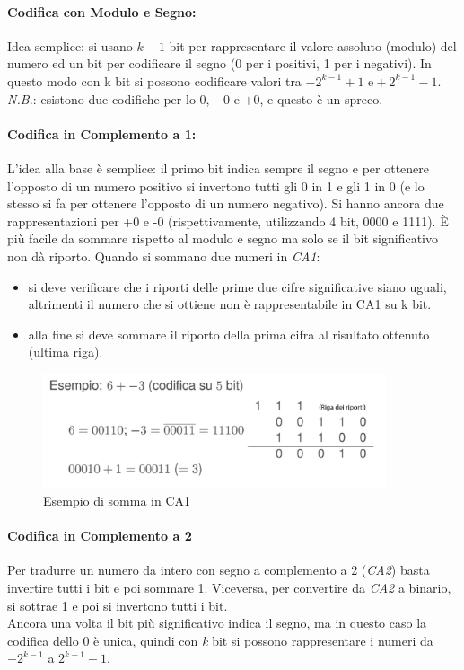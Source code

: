 \documentclass[class=book, crop=false, oneside]{standalone}
\begin{document}
\paragraph*{Codifica con Modulo e Segno:} Idea semplice: si usano $k-1$ bit per rappresentare il valore assoluto (modulo) del numero  ed un bit per codificare il segno (0 per i positivi, 1 per i negativi). In questo modo con k bit si possono codificare valori tra $-2^{k-1}+1 \text{ e} +2^{k-1}-1$.\\
\emph{N.B.}: esistono due codifiche per lo $0$, $-0$  e $+0$, e questo è un spreco.

\paragraph*{Codifica in Complemento a 1:} L’idea alla base è semplice: il primo bit indica sempre il segno e per ottenere l’opposto di un numero positivo si invertono tutti gli 0 in 1 e gli 1 in 0 (e lo stesso si fa per ottenere l’opposto di un numero negativo). Si hanno ancora due rappresentazioni per +0 e -0 (rispettivamente, utilizzando 4 bit, 0000 e 1111). È più facile da sommare rispetto al modulo e segno ma solo se il bit significativo non dà riporto.
Quando si sommano due numeri in \emph{CA1}:
\begin{itemize}[noitemsep]
	\item si deve verificare che i riporti delle prime due cifre significative siano uguali, altrimenti il numero che si ottiene non è rappresentabile in CA1 su k bit.
	\item alla fine si deve sommare il riporto della prima cifra al risultato ottenuto (ultima riga).
\end{itemize}

\begin{figure}[H]
	\centering
	\includegraphics[width=0.9\textwidth,keepaspectratio]{Somma-CA1.png}
	\caption{Esempio di somma in CA1}
\end{figure}

\paragraph*{Codifica in Complemento a 2} Per tradurre un numero da intero con segno a complemento a 2 (\emph{CA2}) basta invertire tutti i bit e poi sommare 1. Viceversa, per convertire da \emph{CA2} a binario, si sottrae 1 e poi si invertono tutti i bit. \\
Ancora una volta il bit più significativo indica il segno, ma in questo caso la codifica dello 0 è unica, quindi con \emph{k} bit si possono rappresentare i numeri da $-2^{k-1}$ a $2^{k-1}-1$.
\end{document}
